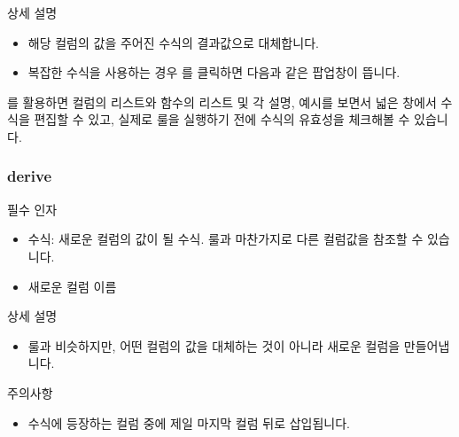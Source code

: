 \documentclass[letterpaper,10pt,english]{sphinxmanual}
\begin{document}
상세 설명
\begin{itemize}
\item {} 
해당 컬럼의 값을 주어진 수식의 결과값으로 대체합니다.

\item {} 
복잡한 수식을 사용하는 경우 를 클릭하면 다음과 같은 팝업창이 뜹니다.
\begin{quote}

\begin{figure}[H]
\centering

\noindent{}
\end{figure}
\end{quote}

\end{itemize}

를 활용하면 컬럼의 리스트와 함수의 리스트 및 각 설명, 예시를 보면서 넓은 창에서 수식을 편집할 수 있고, 실제로 룰을 실행하기 전에 수식의 유효성을 체크해볼 수 있습니다.


\subsubsection{derive}
\label{\detokenize{discovery/part07/rule_kinds:derive}}
필수 인자
\begin{itemize}
\item {} 
수식: 새로운 컬럼의 값이 될 수식. {\hyperref[\detokenize{discovery/part07/rule_kinds:set}]{}} 룰과 마찬가지로 다른 컬럼값을 참조할 수 있습니다.

\item {} 
새로운 컬럼 이름

\end{itemize}

상세 설명
\begin{itemize}
\item {} 
{\hyperref[\detokenize{discovery/part07/rule_kinds:set}]{}} 룰과 비슷하지만, 어떤 컬럼의 값을 대체하는 것이 아니라 새로운 컬럼을 만들어냅니다.

\end{itemize}

주의사항
\begin{itemize}
\item {} 
수식에 등장하는 컬럼 중에 제일 마지막 컬럼 뒤로 삽입됩니다.

\end{itemize}
\end{document}
